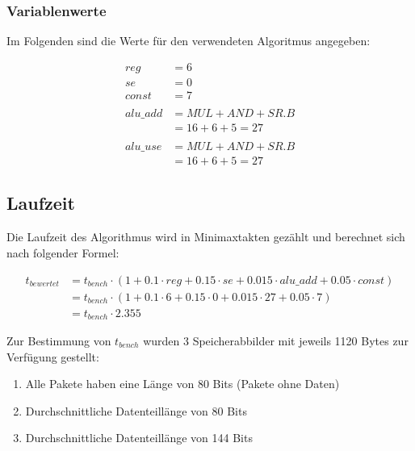 \subsubsection{Variablenwerte}
\label{subsubsection:Dokumentation-BenchmarkBewertung-Berechnung-Variablen-Variablenwerte}

Im Folgenden sind die Werte für den verwendeten Algoritmus angegeben:

\begin{align*}
    reg      &= 6 \\
    se       &= 0 \\
    const    &= 7 \\ \\
    alu\_add &= MUL + AND + SR.B \\
             &= 16 + 6 + 5 = 27 \\ \\
    alu\_use &= MUL + AND + SR.B \\
             &= 16 + 6 + 5 = 27
\end{align*}

\subsection{Laufzeit}
\label{subsection:Dokumentation-BenchmarkBewertung-Berechnung-Laufzeit}

Die Laufzeit des Algorithmus wird in Minimaxtakten gezählt und berechnet sich nach folgender Formel:

\begin{align*}
    t_{bewertet} &= t_{bench} \cdot (1 + 0.1 \cdot reg + 0.15 \cdot se + 0.015 \cdot alu\_add + 0.05 \cdot const) \\
                 &= t_{bench} \cdot (1 + 0.1 \cdot 6 + 0.15 \cdot 0 + 0.015 \cdot 27 + 0.05 \cdot 7) \\
                 &= t_{bench} \cdot 2.355
\end{align*}

Zur Bestimmung von $t_{bench}$ wurden 3 Speicherabbilder mit jeweils 1120 Bytes zur Verfügung gestellt:

\begin{enumerate}
    \item Alle Pakete haben eine Länge von 80 Bits (Pakete ohne Daten)
    \item Durchschnittliche Datenteillänge von 80 Bits
    \item Durchschnittliche Datenteillänge von 144 Bits
\end{enumerate}

